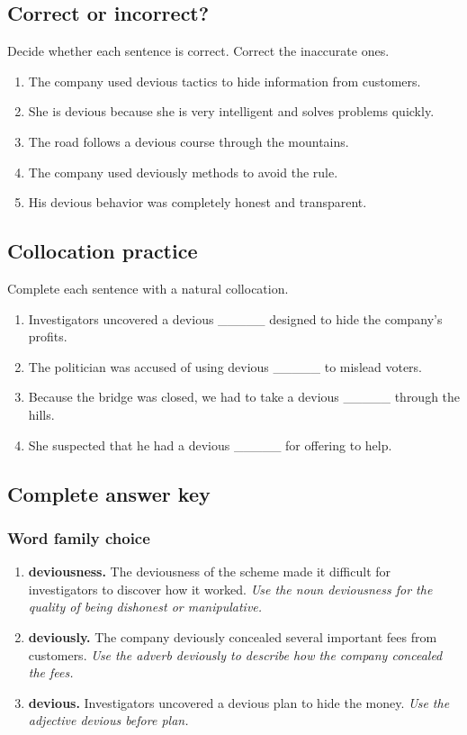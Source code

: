 \documentclass[11pt]{article}
\begin{document}
\subsection{Correct or incorrect?}
Decide whether each sentence is correct. Correct the inaccurate ones.

\begin{enumerate}
  \item The company used devious tactics to hide information from customers.
  \item She is devious because she is very intelligent and solves problems quickly.
  \item The road follows a devious course through the mountains.
  \item The company used deviously methods to avoid the rule.
  \item His devious behavior was completely honest and transparent.
\end{enumerate}

\subsection{Collocation practice}
Complete each sentence with a natural collocation.

\begin{enumerate}
  \item Investigators uncovered a devious \_\_\_\_\_ designed to hide the company's profits.
  \item The politician was accused of using devious \_\_\_\_\_ to mislead voters.
  \item Because the bridge was closed, we had to take a devious \_\_\_\_\_ through the hills.
  \item She suspected that he had a devious \_\_\_\_\_ for offering to help.
\end{enumerate}

\subsection{Complete answer key}
\subsubsection{Word family choice}
\begin{enumerate}
  \item \textbf{deviousness.} The deviousness of the scheme made it difficult for investigators to discover how it worked. \emph{Use the noun deviousness for the quality of being dishonest or manipulative.}
  \item \textbf{deviously.} The company deviously concealed several important fees from customers. \emph{Use the adverb deviously to describe how the company concealed the fees.}
  \item \textbf{devious.} Investigators uncovered a devious plan to hide the money. \emph{Use the adjective devious before plan.}
\end{enumerate}
\end{document}

